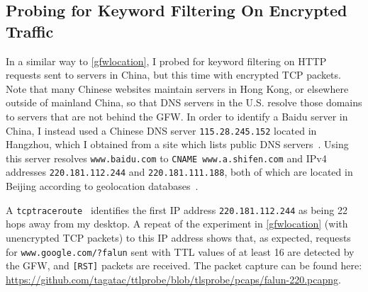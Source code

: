 \subsection{Probing for Keyword Filtering On \allowbreak{}Encrypted Traffic}\label{gfwtls}
In a similar way to \autoref{gfwlocation}, I probed for keyword filtering on HTTP requests sent to servers in China, but this time with encrypted TCP packets.
Note that many Chinese websites maintain servers in Hong Kong, or elsewhere outside of mainland China, so that DNS servers in the U.S. resolve those domains to servers that are not behind the GFW.
In order to identify a Baidu server in China, I instead used a Chinese DNS server \texttt{115.28.245.152} located in Hangzhou, which I obtained from a site which lists public DNS servers~\cite{PublicDNS}.
Using this server resolves \texttt{www.baidu.com} to \texttt{CNAME www.a.shifen.com} and IPv4 addresses \texttt{220.181.112.244} and \texttt{220.181.111.188}, both of which are located in Beijing according to geolocation databases~\cite{IPLookup244,IPLookup188}.

A \texttt{tcptraceroute}~\cite{Toren2006} identifies the first IP address \texttt{220.181.112.244} as being 22 hops away from my desktop.
A repeat of the experiment in \autoref{gfwlocation} (with unencrypted TCP packets) to this IP address shows that, as expected, requests for \texttt{www.google.com/?falun} sent with TTL values of at least 16 are detected by the GFW, and \texttt{[RST]} packets are received.
The packet capture can be found here: \url{https://github.com/tagatac/ttlprobe/blob/tlsprobe/pcaps/falun-220.pcapng}.

